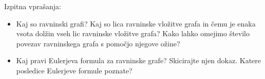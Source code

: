 \begin{enumerate}
    Izpitna vprašanja:
    \begin{itemize}
        \item  Kaj so ravninski grafi? Kaj so lica ravninske vložitve grafa in čemu je enaka vsota dolžin vseh lic ravninske vložitve grafa? Kako lahko omejimo število povezav ravninskega grafa s pomočjo njegove ožine?
        \item Kaj pravi Eulerjeva formula za ravninske grafe? Skicirajte njen dokaz. Katere posledice Eulerjeve formule poznate?
    \end{itemize}  
\end{enumerate}